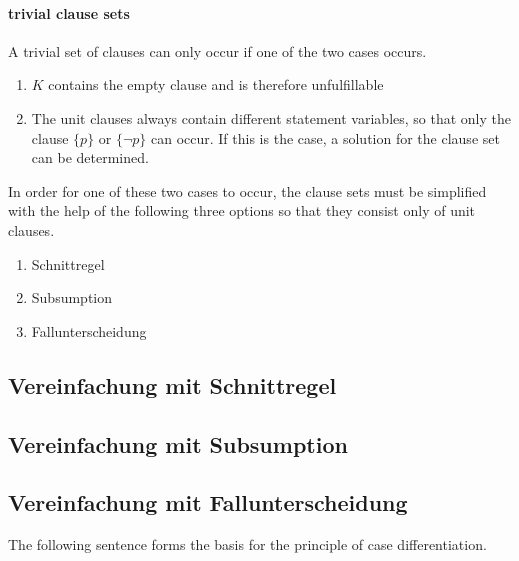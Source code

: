\paragraph{trivial clause sets} %
A trivial set of clauses can only occur if one of the two cases occurs.
\begin{enumerate}
\item %
$K$ contains the empty clause and is therefore unfulfillable
\item %
The unit clauses always contain different statement variables, so that only the clause $\{p\}$ or $\{\neg p\}$ can occur. If this is the case, a solution for the clause set can be determined.
\\
\end{enumerate}
In order for one of these two cases to occur, the clause sets must be simplified with the help of the following three options so that they consist only of unit clauses.
\begin{enumerate}
\item Schnittregel %
\item Subsumption
\item Fallunterscheidung
\end{enumerate}
\subsection{Vereinfachung mit Schnittregel} %
\subsection{Vereinfachung mit Subsumption}
\subsection{Vereinfachung mit Fallunterscheidung}
The following sentence forms the basis for the principle of case differentiation. %
